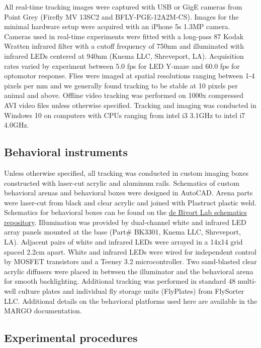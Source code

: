 \documentclass[12pt,letterpaper]{article}
\begin{document}
All real-time tracking images were captured with USB or GigE cameras from Point Grey (Firefly MV 13SC2 and BFLY-PGE-12A2M-CS). Images for the minimal hardware setup were acquired with an iPhone 5s 1.3MP camera. Cameras used in real-time experiments were fitted with a long-pass 87 Kodak Wratten infrared filter with a cutoff frequency of 750nm and illuminated with infrared LEDs centered at 940nm (Knema LLC, Shreveport, LA). Acquisition rates varied by experiment between 5.0 fps for LED Y-maze and 60.0 fps for optomotor response. Flies were imaged at spatial resolutions ranging between 1-4 pixels per mm and we generally found tracking to be stable at 10 pixels per animal and above. Offline video tracking was performed on 1000x compressed AVI video files unless otherwise specified. Tracking and imaging was conducted in Windows 10 on computers with CPUs ranging from intel i3 3.1GHz to intel i7 4.0GHz. 

 \subsection*{Behavioral instruments}

Unless otherwise specified, all tracking was conducted in custom imaging boxes constructed with laser-cut acrylic and aluminum rails. Schematics of custom behavioral arenas and behavioral boxes were designed in AutoCAD. Arena parts were laser-cut from black and clear acrylic and joined with Plastruct plastic weld. Schematics for behavioral boxes can be found on the \href{https://github.com/de-Bivort-Lab/dblab-schematics}{de Bivort Lab schematics repository}. Illumination was provided by dual-channel white and infrared LED array panels mounted at the base (Part\# BK3301, Knema LLC, Shreveport, LA). Adjacent pairs of white and infrared LEDs were arrayed in a 14x14 grid spaced 2.2cm apart. White and infrared LEDs were wired for independent control by MOSFET transistors and a Teensy 3.2 microcontroller. Two sand-blasted clear acrylic diffusers were placed in between the illuminator and the behavioral arena for smooth backlighting. Additional tracking was performed in standard 48 multi-well culture plates and individual fly storage units (FlyPlates) from FlySorter LLC. Additional details on the behavioral platforms used here are available in the MARGO documentation.

\subsection*{Experimental procedures}
\end{document}

